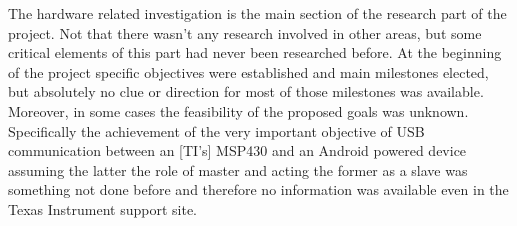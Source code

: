 	The hardware related investigation is the main section of the research part of the project. Not that there wasn't any research involved in other areas, but some critical elements of this part had never been researched before. 
	At the beginning of the project specific objectives were established and main milestones elected, but absolutely no clue or direction for most of those milestones was available.
	Moreover, in some cases the feasibility of the proposed goals was unknown. Specifically the achievement of the very important objective of USB communication between an [TI's] MSP430 %
	and an Android powered device assuming the latter the role of master and acting the former as a slave was something not done before and therefore no information was available  even in the Texas Instrument support site.\\



